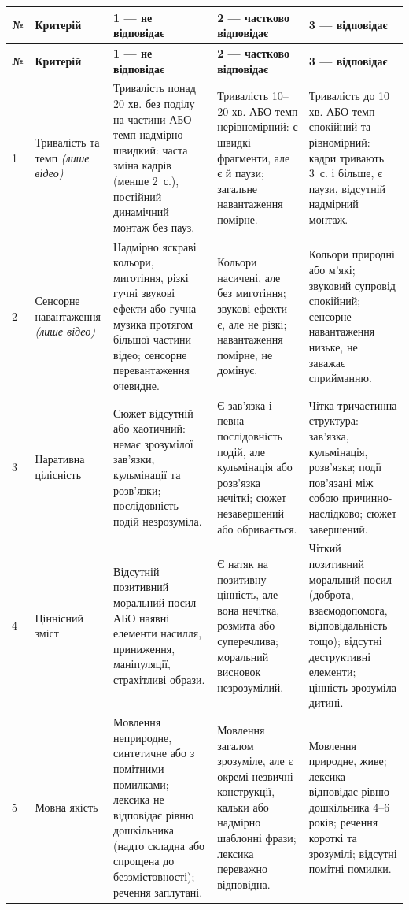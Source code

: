 \documentclass[14pt, a4paper]{extreport}
\begin{document}
\begingroup
\setlength{\tabcolsep}{4pt}
\small
\begin{longtable}{|p{0.4cm}|p{2.8cm}|p{3.4cm}|p{3.4cm}|p{3.4cm}|}
\hline
\rowcolor{tblhead}\textbf{№} & \textbf{Критерій} & \textbf{1 — не відповідає} & \textbf{2 — частково відповідає} & \textbf{3 — відповідає} \\
\hline
\endfirsthead
\hline
\rowcolor{tblhead}\textbf{№} & \textbf{Критерій} & \textbf{1 — не відповідає} & \textbf{2 — частково відповідає} & \textbf{3 — відповідає} \\
\hline
\endhead
1 & Тривалість та темп \newline\textit{(лише відео)} & Тривалість понад 20 хв. без поділу на частини АБО темп надмірно швидкий: часта зміна кадрів (менше 2~с.), постійний динамічний монтаж без пауз. & Тривалість 10--20 хв. АБО темп нерівномірний: є швидкі фрагменти, але є й паузи; загальне навантаження помірне. & Тривалість до 10 хв. АБО темп спокійний та рівномірний: кадри тривають 3~с. і більше, є паузи, відсутній надмірний монтаж. \\
\hline
2 & Сенсорне навантаження \newline\textit{(лише відео)} & Надмірно яскраві кольори, миготіння, різкі гучні звукові ефекти або гучна музика протягом більшої частини відео; сенсорне перевантаження очевидне. & Кольори насичені, але без миготіння; звукові ефекти є, але не різкі; навантаження помірне, не домінує. & Кольори природні або м'які; звуковий супровід спокійний; сенсорне навантаження низьке, не заважає сприйманню. \\
\hline
3 & Наративна цілісність & Сюжет відсутній або хаотичний: немає зрозумілої зав'язки, кульмінації та розв'язки; послідовність подій незрозуміла. & Є зав'язка і певна послідовність подій, але кульмінація або розв'язка нечіткі; сюжет незавершений або обривається. & Чітка тричастинна структура: зав'язка, кульмінація, розв'язка; події пов'язані між собою причинно-наслідково; сюжет завершений. \\
\hline
4 & Ціннісний зміст & Відсутній позитивний моральний посил АБО наявні елементи насилля, приниження, маніпуляції, страхітливі образи. & Є натяк на позитивну цінність, але вона нечітка, розмита або суперечлива; моральний висновок незрозумілий. & Чіткий позитивний моральний посил (доброта, взаємодопомога, відповідальність тощо); відсутні деструктивні елементи; цінність зрозуміла дитині. \\
\hline
5 & Мовна якість & Мовлення неприродне, синтетичне або з помітними помилками; лексика не відповідає рівню дошкільника (надто складна або спрощена до беззмістовності); речення заплутані. & Мовлення загалом зрозуміле, але є окремі незвичні конструкції, кальки або надмірно шаблонні фрази; лексика переважно відповідна. & Мовлення природне, живе; лексика відповідає рівню дошкільника 4--6 років; речення короткі та зрозумілі; відсутні помітні помилки. \\

\end{longtable}
\end{document}
